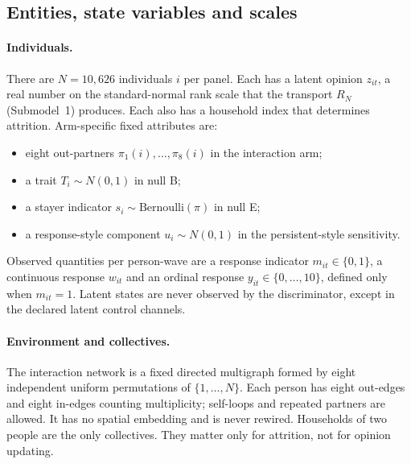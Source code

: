 \subsection{Entities, state variables and scales}

\paragraph{Individuals.}
There are $N=10{,}626$ individuals $i$ per panel. Each has a latent opinion $z_{it}$, a real number on the standard-normal rank scale that the transport $R_N$ (Submodel~1) produces. Each also has a household index that determines attrition. Arm-specific fixed attributes are:
\begin{itemize}
\item eight out-partners $\pi_1(i),\ldots,\pi_8(i)$ in the interaction arm;
\item a trait $T_i\sim N(0,1)$ in null B;
\item a stayer indicator $s_i\sim\mathrm{Bernoulli}(\pi)$ in null E;
\item a response-style component $u_i\sim N(0,1)$ in the persistent-style sensitivity.
\end{itemize}
Observed quantities per person-wave are a response indicator $m_{it}\in\{0,1\}$, a continuous response $w_{it}$ and an ordinal response $y_{it}\in\{0,\ldots,10\}$, defined only when $m_{it}=1$. Latent states are never observed by the discriminator, except in the declared latent control channels.

\paragraph{Environment and collectives.}
The interaction network is a fixed directed multigraph formed by eight independent uniform permutations of $\{1,\ldots,N\}$. Each person has eight out-edges and eight in-edges counting multiplicity; self-loops and repeated partners are allowed. It has no spatial embedding and is never rewired. Households of two people are the only collectives. They matter only for attrition, not for opinion updating.

